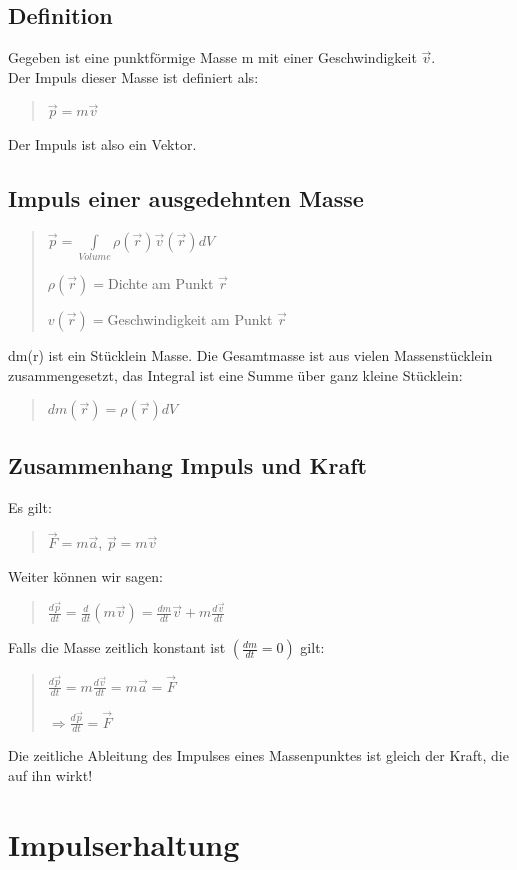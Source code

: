 \subsection*{Definition}

Gegeben ist eine punktförmige Masse m mit einer Geschwindigkeit $\vec{v}$.\\
Der Impuls dieser Masse ist definiert als:
\begin{verse}
$\vec{p}=m\vec{v}$
\end{verse}
Der Impuls ist also ein Vektor.


\subsection*{Impuls einer ausgedehnten Masse}
\begin{verse}
$\vec{p}=\underset{Volume}{\int}\rho(\vec{r})\vec{v}(\vec{r})dV$

$\rho(\vec{r})=$Dichte am Punkt $\vec{r}$

$v(\vec{r})=$Geschwindigkeit am Punkt $\vec{r}$
\end{verse}
dm(r) ist ein Stücklein Masse. Die Gesamtmasse ist aus vielen Massenstücklein
zusammengesetzt, das Integral ist eine Summe über ganz kleine Stücklein:
\begin{verse}
$dm(\vec{r})=\rho(\vec{r})dV$
\end{verse}

\subsection*{Zusammenhang Impuls und Kraft}

Es gilt:
\begin{verse}
$\vec{F}=m\vec{a}$, $\vec{p}=m\vec{v}$
\end{verse}
Weiter können wir sagen:
\begin{verse}
$\frac{d\vec{p}}{dt}=\frac{d}{dt}(m\vec{v})=\frac{dm}{dt}\vec{v}+m\frac{d\vec{v}}{dt}$ 
\end{verse}
Falls die Masse zeitlich konstant ist $(\frac{dm}{dt}=0)$ gilt:
\begin{verse}
$\frac{d\vec{p}}{dt}=m\frac{d\vec{v}}{dt}=m\vec{a}=\vec{F}$

$\Rightarrow\frac{d\vec{p}}{dt}=\vec{F}$
\end{verse}
Die zeitliche Ableitung des Impulses eines Massenpunktes ist gleich
der Kraft, die auf ihn wirkt!


\section*{Impulserhaltung}


